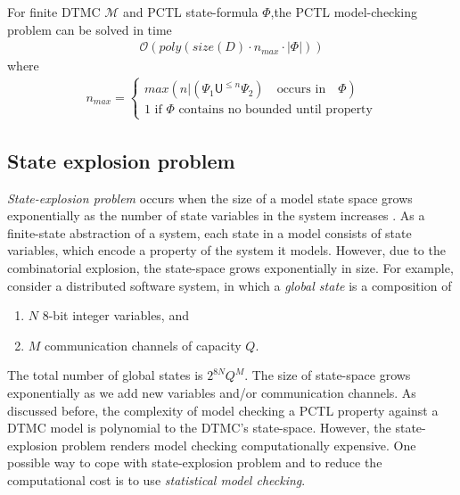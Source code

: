 \begin{theorem}
      For finite DTMC $\mathcal{M}$ and PCTL state-formula $\Phi$,the PCTL model-checking problem
      can be solved in time
      \begin{align*}
            \mathcal{O}(poly(size(D)\cdot n_{max} \cdot |\Phi|))
      \end{align*}
      where
      \begin{align*}
            n_{max} =
            \begin{cases}
                  max(n | (\Psi_1 \mathsf{U}^{\leq n} \Psi_2) \quad\text{occurs in}\quad \Phi) \\
                  1 \text{ if $\Phi$ contains no bounded until property}
            \end{cases}
      \end{align*}
\end{theorem}

\subsection{State explosion problem}
\textit{State-explosion problem} occurs when the size of a model state space grows exponentially as
the number of state variables in the system increases \cite{clarke2011model}. As a finite-state
abstraction of a system, each state in a model consists of state variables, which encode a property
of the system it models. However, due to the combinatorial explosion, the state-space grows
exponentially in size. For example, consider a distributed software system, in which a
\textit{global state} is a composition of
\begin{enumerate}
      \item $N$ 8-bit integer variables, and
      \item $M$ communication channels of capacity $Q$.
\end{enumerate}
The total number of global states is $2^{8N}Q^M$. The size of state-space grows exponentially as we
add new variables and/or communication channels. As discussed before, the complexity of model
checking a PCTL property against a DTMC model is polynomial to the DTMC's state-space. However, the
state-explosion problem renders model checking computationally expensive. One possible way to cope
with state-explosion problem and to reduce the computational cost is to use \textit{statistical
      model checking}.

